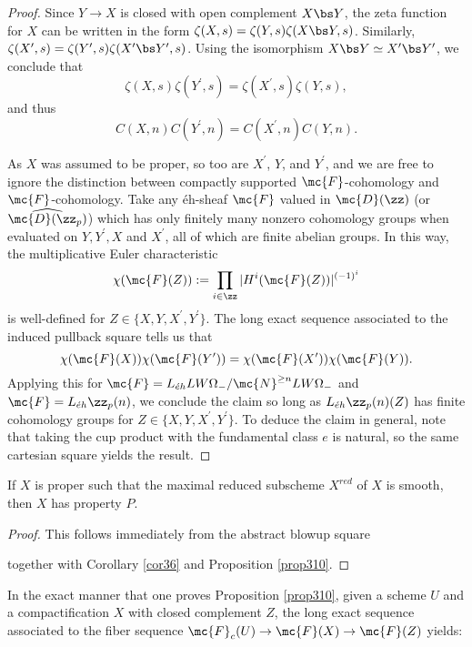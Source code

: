 \begin{proof}
Since $Y\to X$ is closed with open complement $X\bs Y$, the zeta function for $X$ can be written in the form $\zeta(X,s)=\zeta(Y,s)\zeta(X\bs Y,s)$.  Similarly, $\zeta(X^{\prime},s)=\zeta(Y^{\prime},s)\zeta(X^{\prime}\bs Y^{\prime},s)$.  Using the isomorphism $X\bs Y\simeq X^{\prime}\bs Y^{\prime}$, we conclude that $$\zeta(X,s)\zeta(Y^{\prime},s)=\zeta(X^{\prime},s)\zeta(Y,s),$$ and thus $$C(X,n)C(Y^{\prime},n)=C(X^{\prime},n)C(Y,n).$$ 

As $X$ was assumed to be proper, so too are $X^{\prime}$, $Y$, and $Y^{\prime}$, and we are free to ignore the distinction between compactly supported $\mc{F}$-cohomology and $\mc{F}$-cohomology.  Take any \'{e}h-sheaf $\mc{F}$ valued in $\mc{D}(\zz)$ (or $\widehat{\mc{D}(\zz_p)}$) which has only finitely many nonzero cohomology groups when evaluated on $Y,Y^{\prime},X$ and $X^{\prime}$, all of which are finite abelian groups.  In this way, the multiplicative Euler characteristic $$\chi(\mc{F}(Z)):=\prod_{i\in\zz}|H^i(\mc{F}(Z))|^{(-1)^i}$$ is well-defined for $Z\in\{X,Y,X^{\prime},Y^{\prime}\}$.  The long exact sequence associated to the induced pullback square tells us that $$\chi(\mc{F}(X))\chi(\mc{F}(Y^{\prime}))=\chi(\mc{F}(X^{\prime}))\chi(\mc{F}(Y)).$$  Applying this for $\mc{F}=L_{\acute{e}h}LW\Omega_{-}/\mc{N}^{\geq n}LW\Omega_{-}$ and $\mc{F}=L_{\acute{e}h}\zz_p(n)$, we conclude the claim so long as $L_{\acute{e}h}\zz_p(n)(Z)$ has finite cohomology groups for $Z\in\{X,Y,X^{\prime},Y^{\prime}\}$.  To deduce the claim in general, note that taking the cup product with the fundamental class $e$ is natural, so the same cartesian square yields the result.
\end{proof}
\begin{corollary}
	If $X$ is proper such that the maximal reduced subscheme $X^{red}$ of $X$ is smooth, then $X$ has property $P$.
\end{corollary}
\begin{proof}
This follows immediately from the abstract blowup square
\begin{center}
\end{center}
together with Corollary \ref{cor36} and Proposition \ref{prop310}.
\end{proof}
In the exact manner that one proves Proposition \ref{prop310}, given a scheme $U$ and a compactification $X$ with closed complement $Z$, the long exact sequence associated to the fiber sequence $\mc{F}_c(U)\to \mc{F}(X)\to\mc{F}(Z)$ yields:
